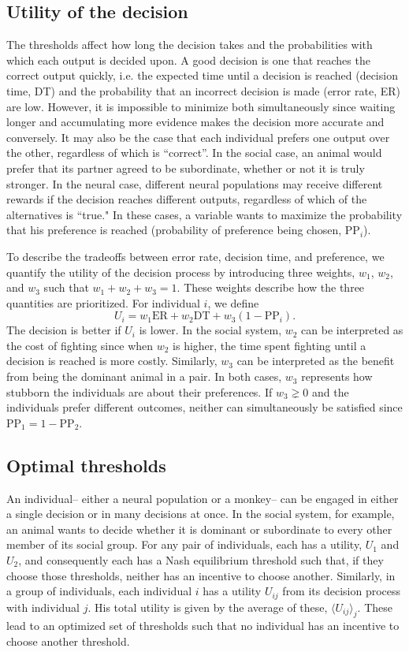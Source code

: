 \documentclass{article}
\begin{document}
\subsection{Utility of the decision }
The thresholds affect how long the decision takes and the probabilities with which each output is decided upon.  A good decision is one that reaches the correct output quickly, i.e. the expected time until a decision is reached (decision time, DT) and the probability that an incorrect decision is made (error rate, ER) are low.   However, it is impossible to minimize both simultaneously since waiting longer and accumulating more evidence makes the decision more accurate and conversely.  It may also be the case that each individual prefers one output over the other, regardless of which is ``correct''.  In the social case, an animal would prefer that its partner agreed to be subordinate, whether or not it is truly stronger.  In the neural case, different neural populations may receive different rewards if the decision reaches different outputs, regardless of which of the alternatives is ``true."  In these cases, a variable wants to maximize the probability that his preference is reached (probability of preference being chosen, $\text{PP}_i$).    

To describe the tradeoffs between error rate, decision time, and preference, we quantify the utility of the decision process by introducing three weights, $w_1$, $w_2$, and $w_3$ such that $w_1+w_2+w_3=1$.  These weights describe how the three quantities are prioritized.  For individual $i$, we define
\begin{equation*}
U_{i}=w_1\text{ER}+w_2\text{DT}+w_3(1-\text{PP}_i).
\end{equation*}
The decision is better if $U_i$ is lower.  In the social system, $w_2$ can be interpreted as the cost of fighting since when $w_2$ is higher, the time spent fighting until a decision is reached is more costly.  Similarly, $w_3$ can be interpreted as the benefit from being the dominant animal in a pair. In both cases, $w_3$ represents how stubborn the individuals are about their preferences. If $w_3\gneq 0$ and the individuals prefer different outcomes, neither can simultaneously be satisfied since $\text{PP}_1=1-\text{PP}_2$.

\subsection{Optimal thresholds }
An individual-- either a neural population or a monkey-- can be engaged in either a single decision or in many decisions at once.  In the social system, for example, an animal wants to decide whether it is dominant or subordinate to every other member of its social group.  For any pair of individuals, each has a utility, $U_1$ and $U_2$, and consequently each has a Nash equilibrium threshold such that, if they choose those thresholds, neither has an incentive to choose another.  Similarly, in a group of individuals, each individual $i$ has a utility $U_{ij}$ from its decision process with individual $j$.  His total utility is given by the average of these, $\langle U_{ij}\rangle _j$. These lead to an optimized set of thresholds such that no individual has an incentive to choose another threshold.
\end{document}
